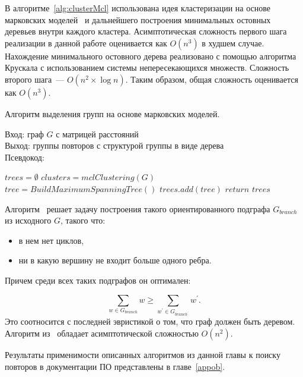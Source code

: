 В алгоритме~\ref{alg:clusterMcl} использована идея кластеризации на основе марковских моделей~\cite{dongen2000cluster} и дальнейшего построения минимальных остовных деревьев внутри каждого кластера.
Асимптотическая сложность первого шага реализации в данной работе оценивается как $O(n^3)$ в худшем случае.
Нахождение минимального остовного дерева реализовано с помощью алгоритма Крускала с использованием системы непересекающихся множеств.
Сложность второго шага~--- $O(n^2 \times \log n)$.
Таким образом, общая сложность оценивается как $O(n^3)$.

\begin{algorithm}[t!]
\caption{Алгоритм выделения групп на основе марковских моделей.}\label{alg:clusterMcl}
Вход: граф $G$ с матрицей расстояний\\
Выход: группы повторов с структурой группы в виде дерева\\
Псевдокод:
\begin{algorithmic}[1]
\State $trees = \emptyset$
\State $ clusters = mclClustering(G)$
\State $tree =  BuildMaximumSpanningTree()$
\State $trees.add(tree)$
\EndFor
\State
\State $return$ $trees$
\end{algorithmic}
\end{algorithm}

Алгоритм~\cite{tofigh2009optimum} решает задачу построения такого ориентированного подграфа $G_{branch}$ из исходного $G$, такого что:
\begin{itemize}
    \item в нем нет циклов,
    \item ни в какую вершину не входит больше одного ребра.
\end{itemize}

Причем среди всех таких подграфов он оптимален:

\begin{equation}
\sum_{w \in G_{branch}} w \geq \sum_{w^{'} \in G_{branch^{'}}} w^{'}.
\end{equation}
Это соотносится с последней эвристикой о том, что граф должен быть деревом.
Алгоритм из~\cite{tofigh2009optimum} обладает асимптотической сложностью $O(n^2)$.

%  

Результаты применимости описанных алгоритмов из  данной главы к поиску повторов в документации ПО представлены в главе~\ref{appob}.


